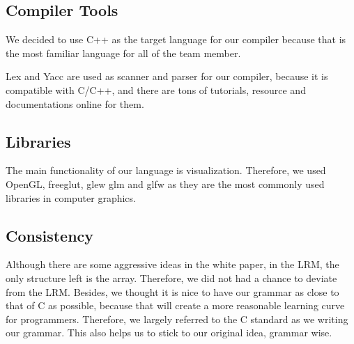 \subsection{Compiler Tools}

We decided to use C++ as the target language for our compiler because that is the most familiar
language for all of the team member. 

Lex and Yacc are used as scanner and parser for our compiler, because it is compatible with C/C++,
and there are tons of tutorials, resource and documentations online for them. 

\subsection{Libraries}

The main functionality of our language is visualization. Therefore, we used OpenGL, freeglut, glew
glm and glfw as they are the most commonly used libraries in computer graphics. 

\subsection{Consistency}

Although there are some aggressive ideas in the white paper, in the LRM, the only structure left is
the array. Therefore, we did not had a chance to deviate from the LRM. Besides, we thought it is
nice to have our grammar as close to that of C as possible, because that will create a more
reasonable learning curve for programmers. Therefore, we largely referred to the C standard as we
writing our grammar. This also helps us to stick to our original idea, grammar wise. 
